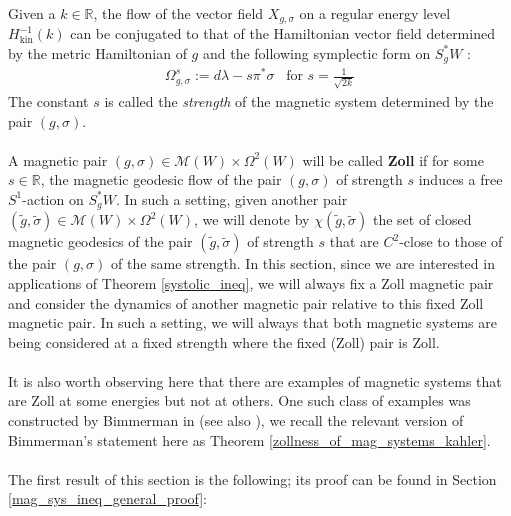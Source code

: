 \documentclass[11pt]{amsart}
\theoremstyle{plain}
\theoremstyle{definition}
\theoremstyle{remark}
\begin{document}
\\
Given a $k \in \mathbb{R}$, the flow of the vector field $X_{g,\sigma}$ on a regular energy level $H_{\text{kin}}^{-1}(k)$ can be conjugated to that of the Hamiltonian vector field determined by the metric Hamiltonian of $g$ and the following symplectic form on $S_g^*W$ \cite{paternain_helicity}:
\begin{align}
    \Omega^s_{g,\sigma}:= d\lambda -s\pi^*\sigma \;\;\; \text{for $s = \frac{1}{\sqrt{2k}}$}
\end{align}
The constant $s$ is called the \emph{strength} of the magnetic system determined by the pair $(g,\sigma)$.\\
\\
A magnetic pair $(g,\sigma) \in \mathcal{M}(W) \times \Omega^2(W)$ will be called \textbf{Zoll} if for some $s \in \mathbb{R}$, the magnetic geodesic flow of the pair $(g,\sigma)$ of strength $s$ induces a free $S^1$-action on $S^*_gW$. In such a setting, given another pair $(\tilde g,\tilde\sigma) \in \mathcal{M}(W) \times \Omega^2(W)$, we will denote by $\chi(\tilde g, \tilde \sigma)$ the set of closed magnetic geodesics of the pair $(\tilde g,\tilde\sigma)$ of strength $s$ that are $C^2$-close to those of the pair $(g,\sigma)$ of the same strength. In this section, since we are interested in applications of Theorem \ref{systolic_ineq}, we will always fix a Zoll magnetic pair and consider the dynamics of another magnetic pair relative to this fixed Zoll magnetic pair. In such a setting, we will always that both magnetic systems are being considered at a fixed strength where the fixed (Zoll) pair is Zoll. \\
\\
It is also worth observing here that there are examples of magnetic systems that are Zoll at some energies but not at others. One such class of examples was constructed by Bimmerman in \cite{j_bimmerman} (see also \cite{paternain_horocycle}), we recall the relevant version of Bimmerman's statement here as Theorem \ref{zollness_of_mag_systems_kahler}.\\
\\
The first result of this section is the following; its proof can be found in Section \ref{mag_sys_ineq_general_proof}: 
\end{document}
